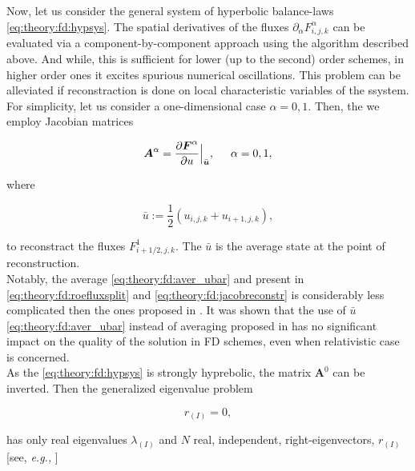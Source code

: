 \documentclass[11pt,a4paper,headinclude=true,DIV=14,BCOR=8mm,chapterprefix,listof=totoc,twoside,openright,abstracton]{scrbook}
\begin{document}
Now, let us consider the general system of hyperbolic balance-laws \ref{eq:theory:fd:hypsys}. The spatial derivatives of the fluxes $\partial_{\alpha} F_{i,j,k} ^{\alpha}$ can be evaluated via a component-by-component approach using the algorithm described above. And while, this is sufficient for lower (up to the second) order schemes, in higher order ones it excites spurious numerical oscillations.
This problem can be alleviated if reconstraction is done on local characteristic variables of the ssystem. For simplicity, let us consider a one-dimensional case $\alpha={0,1}$. Then, the we employ Jacobian matrices

\begin{equation}
    \boldsymbol{A}^{\alpha} = \frac{\partial \boldsymbol{F}^{\alpha}}{\partial u}\Big|_{\bar{\boldsymbol{u}}}, \hspace{5mm} \alpha = 0,1,
    \label{eq:theory:fd:jacobreconstr}
\end{equation}

where 

\begin{equation}
    \bar{u} := \frac{1}{2}(u_{i,j,k} + u_{i+1,j,k}),
    \label{eq:theory:fd:aver_ubar}
\end{equation}

to reconstract the fluxes $F^1 _{i+1/2, j, k}$. The $\bar{u}$ is the average state at the point of reconstruction. \\

Notably, the average \ref{eq:theory:fd:aver_ubar} and present in \ref{eq:theory:fd:roefluxsplit} and \ref{eq:theory:fd:jacobreconstr} is considerably less complicated then the ones proposed in \cite{Roe:1981}. It was shown that the use of $\bar{u}$ \ref{eq:theory:fd:aver_ubar} instead of averaging proposed in \cite{Roe:1981} has no significant impact on the quality of the solution in FD schemes, even when relativistic case is concerned. \\

As the \ref{eq:theory:fd:hypsys} is strongly hyprebolic, the matrix $\boldsymbol{A}^0$ can be inverted. Then the generalized eigenvalue problem 

\begin{equation}
    [\boldsymbol{A}^1 - \lambda_{(1)}\boldsymbol{A}^0]r_{(I)} = 0,
\end{equation}

has only real eigenvalues $\lambda_{(I)}$ and $N$ real, independent, right-eigenvectors, $r_{(I)}$ [see, \textit{e.g.,} \cite{Anile:1990}]
\end{document}
